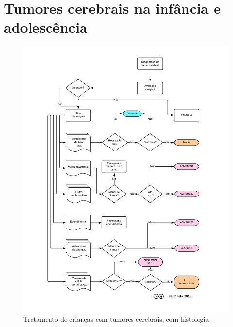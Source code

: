 \documentclass[11pt,a4paper,oldfontcommands]{memoir}
\begin{document}
\section{Tumores cerebrais na infância e adolescência}
\begin{center}
\begin{figure}[htpb]
\includegraphics[scale=0.9,trim = 10mm 10mm 8mm 5mm,clip]{fig/fig1.pdf}
\caption{Tratamento de crianças com tumores cerebrais, com histologia}
\end{figure}
\begin{figure}[!htb]

\end{figure}
\end{center}
\end{document}

